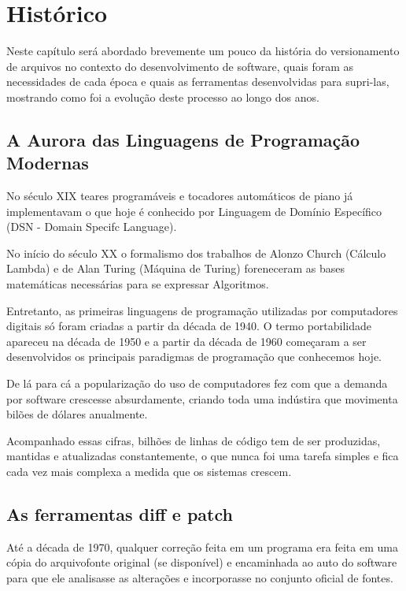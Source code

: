 \chapter{Histórico}

Neste capítulo será abordado brevemente um pouco da história do versionamento de arquivos
no contexto do desenvolvimento de software, quais foram as necessidades de cada época e quais
as ferramentas desenvolvidas para supri-las, mostrando como foi a evolução deste processo
ao longo dos anos.

\section{A Aurora das Linguagens de Programação Modernas}

No século XIX teares programáveis e tocadores automáticos de piano já implementavam o que
hoje é conhecido por Linguagem de Domínio Específico (DSN - Domain Specifc Language).

No início do século XX  o formalismo dos trabalhos de Alonzo Church (Cálculo Lambda) e
de Alan Turing (Máquina de Turing) foreneceram as bases matemáticas necessárias para se
expressar Algoritmos.
 
Entretanto, as primeiras linguagens de programação utilizadas por computadores digitais
só foram criadas a partir da década de 1940. O termo portabilidade apareceu na década de
1950 e a partir da década de 1960 começaram a ser desenvolvidos os principais paradigmas
de programação que conhecemos hoje.

De lá para cá a popularização do uso de computadores fez com que a demanda por software
crescesse absurdamente, criando toda uma indústira que movimenta bilões de dólares anualmente.

Acompanhado essas cifras, bilhões de linhas de código tem de ser produzidas, mantidas e atualizadas constantemente, o que nunca foi uma tarefa simples e fica cada vez mais complexa a medida
que os sistemas crescem.

\section{As ferramentas diff e patch}

Até a década de 1970, qualquer correção feita em um programa era feita em
uma cópia do arquivofonte original (se disponível) e encaminhada ao auto
do software para que ele analisasse as alterações e incorporasse no
conjunto oficial de fontes.

